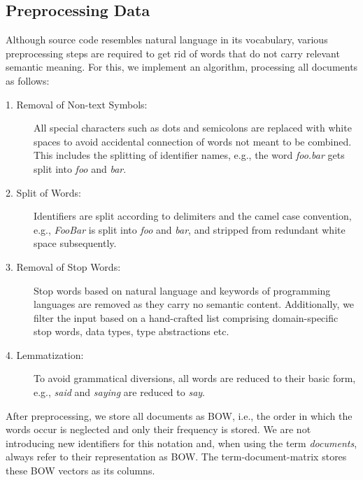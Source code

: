 \documentclass[a4paper,twoside]{article}
\begin{document}
\subsection{Preprocessing Data}
Although source code resembles natural language in its vocabulary, various preprocessing steps are required to get rid of words that do not carry relevant semantic meaning. 
For this, we implement an algorithm, processing all documents as follows:
\begin{description}

    \item [1. Removal of Non-text Symbols:] All special characters such as dots and semicolons are replaced with white spaces to avoid accidental connection of words not meant to be combined.
    This includes the splitting of identifier names, e.g., the word \emph{foo.bar} gets split into \emph{foo} and \emph{bar}.
    
    \item [2. Split of Words:] Identifiers are split according to delimiters and the camel case convention, e.g., \emph{FooBar} is split into \emph{foo} and \emph{bar}, and stripped from redundant white space subsequently. 

    \item [3. Removal of Stop Words:] Stop words based on natural language and keywords of programming languages are removed as they carry no semantic content. Additionally, we filter the input based on a hand-crafted list comprising domain-specific stop words, data types, type abstractions etc.
    
    \item [4. Lemmatization:] To avoid grammatical diversions, all words are reduced to their basic form, e.g., \emph{said} and \emph{saying} are reduced to \emph{say}.

\end{description}

After preprocessing, we store all documents as \ac{BOW}, i.e., the order in which the words occur is neglected and only their frequency is stored.
We are not introducing new identifiers for this notation and, when using the term \emph{documents}, always refer to their representation as \ac{BOW}.
The term-document-matrix stores these \ac{BOW} vectors as its columns.
\end{document}
